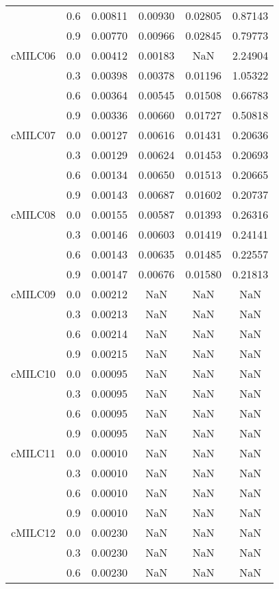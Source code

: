 \begin{longtable}{cccccc}
        & 0.6 & 0.00811 & 0.00930 & 0.02805 & 0.87143 \\
        & 0.9 & 0.00770 & 0.00966 & 0.02845 & 0.79773 \\
cMILC06 & 0.0 & 0.00412 & 0.00183 & NaN & 2.24904 \\
        & 0.3 & 0.00398 & 0.00378 & 0.01196 & 1.05322 \\
        & 0.6 & 0.00364 & 0.00545 & 0.01508 & 0.66783 \\
        & 0.9 & 0.00336 & 0.00660 & 0.01727 & 0.50818 \\
cMILC07 & 0.0 & 0.00127 & 0.00616 & 0.01431 & 0.20636 \\
        & 0.3 & 0.00129 & 0.00624 & 0.01453 & 0.20693 \\
        & 0.6 & 0.00134 & 0.00650 & 0.01513 & 0.20665 \\
        & 0.9 & 0.00143 & 0.00687 & 0.01602 & 0.20737 \\
cMILC08 & 0.0 & 0.00155 & 0.00587 & 0.01393 & 0.26316 \\
        & 0.3 & 0.00146 & 0.00603 & 0.01419 & 0.24141 \\
        & 0.6 & 0.00143 & 0.00635 & 0.01485 & 0.22557 \\
        & 0.9 & 0.00147 & 0.00676 & 0.01580 & 0.21813 \\
cMILC09 & 0.0 & 0.00212 & NaN & NaN & NaN \\
        & 0.3 & 0.00213 & NaN & NaN & NaN \\
        & 0.6 & 0.00214 & NaN & NaN & NaN \\
        & 0.9 & 0.00215 & NaN & NaN & NaN \\
cMILC10 & 0.0 & 0.00095 & NaN & NaN & NaN \\
        & 0.3 & 0.00095 & NaN & NaN & NaN \\
        & 0.6 & 0.00095 & NaN & NaN & NaN \\
        & 0.9 & 0.00095 & NaN & NaN & NaN \\
cMILC11 & 0.0 & 0.00010 & NaN & NaN & NaN \\
        & 0.3 & 0.00010 & NaN & NaN & NaN \\
        & 0.6 & 0.00010 & NaN & NaN & NaN \\
        & 0.9 & 0.00010 & NaN & NaN & NaN \\
cMILC12 & 0.0 & 0.00230 & NaN & NaN & NaN \\
        & 0.3 & 0.00230 & NaN & NaN & NaN \\
        & 0.6 & 0.00230 & NaN & NaN & NaN \\

\end{longtable}
